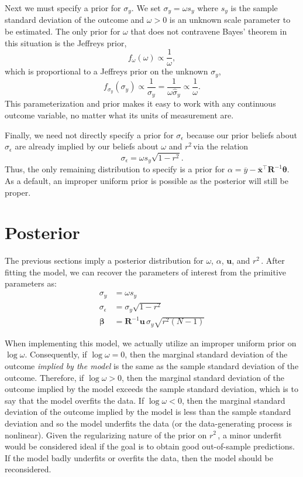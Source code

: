 \documentclass[11pt]{article}
\newcommand{\Rsq}{$r^2\,$}
\newcommand{\boldbeta}{\boldsymbol{\beta}}
\newcommand{\boldtheta}{\boldsymbol{\theta}}
\newcommand{\sigmaEps}{\sigma_{\epsilon}}
\newcommand{\R}{\mathbf{R}}
\renewcommand{\u}{\mathbf{u}}
\begin{document}
Next we must specify a prior for $\sigma_y$. We set $\sigma_y = \omega s_y$
where $s_y$ is the sample standard deviation of the outcome and $\omega > 0$ is
an unknown scale parameter to be estimated. The only prior for $\omega$ that
does not contravene Bayes' theorem in this situation is the Jeffreys prior,
$$f_\omega \left(\omega\right) \propto \frac{1}{\omega},$$
which is proportional to a Jeffreys prior on the unknown $\sigma_y$,
$$f_{\sigma_y} \left(\sigma_y\right) \propto \frac{1}{\sigma_y}
= \frac{1}{\omega \widehat{\sigma}_y} \propto \frac{1}{\omega}.$$
This parameterization and prior makes it easy to work with any continuous
outcome variable, no matter what its units of measurement are.

Finally, we need not directly specify a prior for $\sigmaEps$ because our prior
beliefs about $\sigmaEps$ are already implied by our beliefs about $\omega$ and
\Rsq via the relation
$$\sigmaEps = \omega s_y \sqrt{1 - r^2}.$$
Thus, the only remaining distribution to specify is a prior for
$\alpha = \overline{y} - \overline{\mathbf{x}}^\top \R^{-1} \boldtheta$.
As a default, an improper uniform prior is possible as the posterior will still
be proper.


\section{Posterior}

The previous sections imply a posterior distribution for $\omega$, $\alpha$,
$\u$, and \Rsq. After fitting the model, we can recover the parameters
of interest from the primitive parameters as:
%
\begin{align*}
\sigma_y &= \omega s_y \\
\sigmaEps &= \sigma_y \sqrt{1 - r^2} \\
\boldbeta &= \R^{-1} \u \, \sigma_y \sqrt{r^2 \left(N-1\right)}
\end{align*}

When implementing this model, we actually utilize an improper uniform prior on
$\log{\omega}$. Consequently, if $\log{\omega} = 0$, then the marginal standard
deviation of the outcome \emph{implied by the model} is the same as the sample
standard deviation of the outcome. Therefore, if $\log{\omega} > 0$, then the
marginal standard deviation of the outcome implied by the model exceeds the
sample standard deviation, which is to say that the model overfits the data. If
$\log{\omega} < 0$, then the marginal standard deviation of the outcome implied
by the model is less than the sample standard deviation and so the model
underfits the data (or the data-generating process is nonlinear). Given the
regularizing nature of the prior on \Rsq, a minor underfit would be considered
ideal if the goal is to obtain good out-of-sample predictions. If the model
badly underfits or overfits the data, then the model should be reconsidered.
\end{document}
